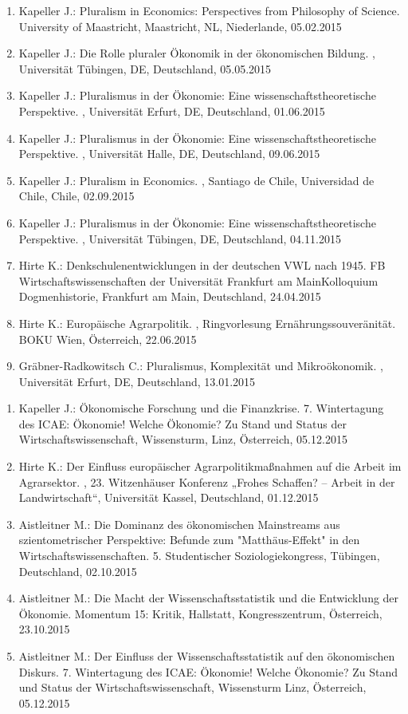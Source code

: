 \begin{enumerate}
	\item Kapeller J.: Pluralism in Economics: Perspectives from Philosophy of Science. University of Maastricht, Maastricht, NL, Niederlande, 05.02.2015
	\item Kapeller J.: Die Rolle pluraler Ökonomik in der ökonomischen Bildung. , Universität Tübingen, DE, Deutschland, 05.05.2015
	\item Kapeller J.: Pluralismus in der Ökonomie: Eine wissenschaftstheoretische Perspektive. , Universität Erfurt, DE, Deutschland, 01.06.2015
	\item Kapeller J.: Pluralismus in der Ökonomie: Eine wissenschaftstheoretische Perspektive. , Universität Halle, DE, Deutschland, 09.06.2015
	\item Kapeller J.: Pluralism in Economics. , Santiago de Chile, Universidad de Chile, Chile, 02.09.2015
	\item Kapeller J.: Pluralismus in der Ökonomie: Eine wissenschaftstheoretische Perspektive. , Universität Tübingen, DE, Deutschland, 04.11.2015
	\item Hirte K.: Denkschulenentwicklungen in der deutschen VWL nach 1945. FB Wirtschaftswissenschaften der Universität Frankfurt am MainKolloquium Dogmenhistorie, Frankfurt am Main, Deutschland, 24.04.2015
	\item Hirte K.: Europäische Agrarpolitik. , Ringvorlesung Ernährungssouveränität. BOKU Wien, Österreich, 22.06.2015
	\item Gräbner-Radkowitsch C.: Pluralismus, Komplexität und Mikroökonomik. , Universität Erfurt, DE, Deutschland, 13.01.2015
\end{enumerate}

\begin{enumerate}
	\item Kapeller J.: Ökonomische Forschung und die Finanzkrise. 7. Wintertagung des ICAE: Ökonomie! Welche Ökonomie? Zu Stand und Status der Wirtschaftswissenschaft, Wissensturm, Linz, Österreich, 05.12.2015
	\item Hirte K.: Der Einfluss europäischer Agrarpolitikmaßnahmen auf die Arbeit im Agrarsektor. , 23. Witzenhäuser Konferenz „Frohes Schaffen? – Arbeit in der Landwirtschaft“, Universität Kassel, Deutschland, 01.12.2015
	\item Aistleitner M.: Die Dominanz des ökonomischen Mainstreams aus szientometrischer Perspektive: Befunde zum "Matthäus-Effekt" in den Wirtschaftswissenschaften. 5. Studentischer Soziologiekongress, Tübingen, Deutschland, 02.10.2015
	\item Aistleitner M.: Die Macht der Wissenschaftsstatistik und die Entwicklung der Ökonomie. Momentum 15: Kritik, Hallstatt, Kongresszentrum, Österreich, 23.10.2015
	\item Aistleitner M.: Der Einfluss der Wissenschaftsstatistik auf den ökonomischen Diskurs. 7. Wintertagung des ICAE: Ökonomie! Welche Ökonomie? Zu Stand und Status der Wirtschaftswissenschaft, Wissensturm Linz, Österreich, 05.12.2015
\end{enumerate}
